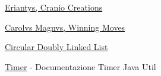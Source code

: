 \documentclass[a4paper, 12pt]{article}
\begin{document}
	\newpage
	\begin{thebibliography}{99}
		\href{https://www.craniocreations.it/prodotto/eriantys/}{Eriantys, Cranio Creations}
		
		\href{https://www.goblins.net/giochi/carolus-magnus-5071}{Carolvs Magnvs, Winning Moves} 
		
		\href{https://www.softwaretestinghelp.com/doubly-linked-list-in-java/#Circular_Doubly_Linked_List_In_Java}{Circular Doubly Linked List}
		
		\href{https://docs.oracle.com/javase/7/docs/api/java/util/Timer.html}{Timer} - Documentazione Timer Java Util
		
	\end{thebibliography} 
\end{document}
